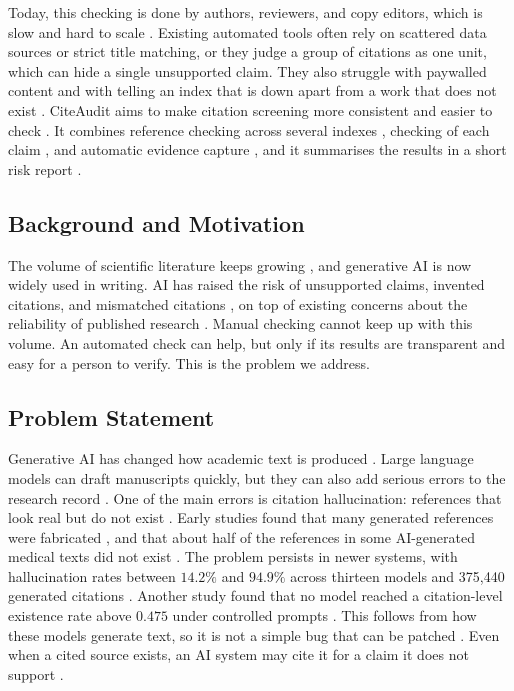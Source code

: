 \documentclass{article}
\begin{document}
Today, this checking is done by authors, reviewers, and copy editors, which is slow and hard to scale \cite{ref1,aczel2021}. Existing automated tools often rely on scattered data sources or strict title matching, or they judge a group of citations as one unit, which can hide a single unsupported claim. They also struggle with paywalled content and with telling an index that is down apart from a work that does not exist \cite{ref1,ref9,ref10}. CiteAudit aims to make citation screening more consistent and easier to check \cite{ref4}. It combines reference checking across several indexes \cite{ref1}, checking of each claim \cite{ref2,ref8}, and automatic evidence capture \cite{ref3}, and it summarises the results in a short risk report \cite{hicks2015}.

\subsection{Background and Motivation}

The volume of scientific literature keeps growing \cite{bornmann2015}, and generative AI is now widely used in writing. AI has raised the risk of unsupported claims, invented citations, and mismatched citations \cite{walters2023,bhattacharyya2023,ji2023}, on top of existing concerns about the reliability of published research \cite{baker2016}. Manual checking cannot keep up with this volume. An automated check can help, but only if its results are transparent and easy for a person to verify. This is the problem we address.

\subsection{Problem Statement}

Generative AI has changed how academic text is produced \cite{ref5,ref6}. Large language models can draft manuscripts quickly, but they can also add serious errors to the research record \cite{ref10}. One of the main errors is citation hallucination: references that look real but do not exist \cite{ref3,alkaissi2023,day2023}. Early studies found that many generated references were fabricated \cite{walters2023}, and that about half of the references in some AI-generated medical texts did not exist \cite{bhattacharyya2023}. The problem persists in newer systems, with hallucination rates between $14.2\%$ and $94.9\%$ across thirteen models and 375{,}440 generated citations \cite{ref9}. Another study found that no model reached a citation-level existence rate above $0.475$ under controlled prompts \cite{ref10}. This follows from how these models generate text, so it is not a simple bug that can be patched \cite{ji2023}. Even when a cited source exists, an AI system may cite it for a claim it does not support \cite{ref8}.
\end{document}
